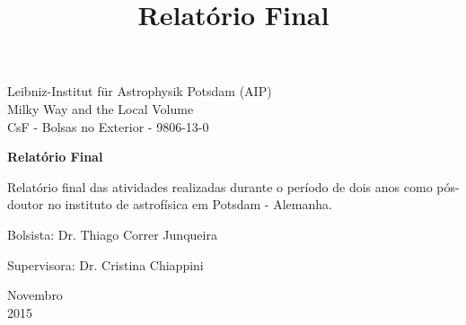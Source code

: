 \documentclass[a4paper, 12pt]{article}
\begin{document}
\begin{titlepage}
	\begin{center}
	

		\Huge{Leibniz-Institut für Astrophysik Potsdam (AIP)}\\
		\large{Milky Way and the Local Volume}\\ 
		\large{CsF - Bolsas no Exterior - 9806-13-0}\\ 
\vspace{15pt}
        
        \vspace{85pt}
        
		\textbf{\LARGE{Relatório Final}}
		\title{\large{Relatório Final}}
			
	\end{center}
\vspace{1,5cm}
	
	\begin{flushright}

   \begin{list}{}{
      \setlength{\leftmargin}{4.5cm}
      \setlength{\rightmargin}{0cm}
      \setlength{\labelwidth}{0pt}
      \setlength{\labelsep}{\leftmargin}}

      \item Relatório final das atividades realizadas durante o período de dois anos como pós-doutor no instituto de astrofísica em Potsdam - Alemanha.  

      \begin{list}{}{
      \setlength{\leftmargin}{0cm}
      \setlength{\rightmargin}{0cm}
      \setlength{\labelwidth}{0pt}
      \setlength{\labelsep}{\leftmargin}}

			\item Bolsista: Dr. Thiago Correr Junqueira \
            \item Supervisora: Dr. Cristina Chiappini\

      \end{list}
   \end{list}
\end{flushright}
\vspace{1cm}
\begin{center}
		\vspace{\fill}
		 Novembro\\
		 2015
			\end{center}
\end{titlepage}
\newpage
\newpage
\tableofcontents
\thispagestyle{empty}
\end{document}

